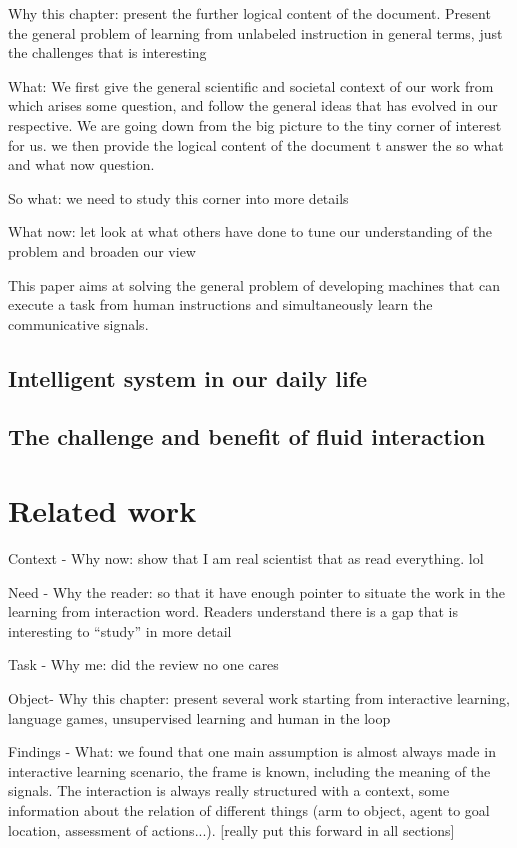 Why this chapter: present the further logical content of the document. Present the general problem of learning from unlabeled instruction in general terms, just the challenges that is interesting 

What: We first give the general scientific and societal context of our work from which arises some question, and follow the general ideas that has evolved in our respective. We are going down from the big picture to the tiny corner of interest for us. we then provide the logical content of the document t answer the so what and what now question.

So what: we need to study this corner into more details

What now: let look at what others have done to tune our understanding of the problem and broaden our view

This paper aims at solving the general problem of developing machines that can execute a task from human instructions and simultaneously learn the communicative signals.


\section{Intelligent system in our daily life}

\section{The challenge and benefit of fluid interaction}

\chapter{Related work}
\minitoc

Context - Why now: show that I am real scientist that as read everything. lol

Need - Why the reader: so that it have enough pointer to situate the work in the learning from interaction word. Readers understand there is a gap that is interesting to ``study'' in more detail

Task - Why me: did the review no one cares

Object- Why this chapter: present several work starting from interactive learning, language games, unsupervised learning and human in the loop

Findings - What: we found that one main assumption is almost always made in interactive learning scenario, the frame is known, including the meaning of the signals. The interaction is always really structured with a context, some information about the relation of different things (arm to object, agent to goal location, assessment of actions...). [really put this forward in all sections]


